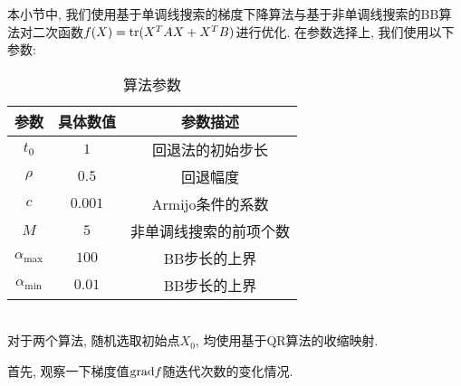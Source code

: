 \documentclass[UTF8]{ctexart}
\begin{document}
本小节中, 我们使用基于单调线搜索的梯度下降算法与基于非单调线搜索的BB算法对二次函数$f(X)=\textup{tr}(X^T AX+X^T B)$进行优化. 在参数选择上, 我们使用以下参数: \\
\begin{table}[htbp]
    \caption{算法参数}
    \centering
    \begin{tabular}{c|cc}
        \hline
        \hline
        参数 & 具体数值 & 参数描述\\
        \hline
        $t_0$ & $1$ & 回退法的初始步长\\
        $\rho$ & $0.5$ & 回退幅度\\
        $c$ & $0.001$ & Armijo条件的系数\\
        $M$ & $5$ & 非单调线搜索的前项个数\\
        $\alpha_{\max}$ & $100$ & BB步长的上界\\
        $\alpha_{\min}$ & $0.01$ & BB步长的上界\\
        \hline
        \hline
    \end{tabular}
\end{table}\\
对于两个算法, 随机选取初始点$X_0$, 均使用基于QR算法的收缩映射. \par
首先, 观察一下梯度值$\textup{grad}f$随迭代次数的变化情况. 
\end{document}
